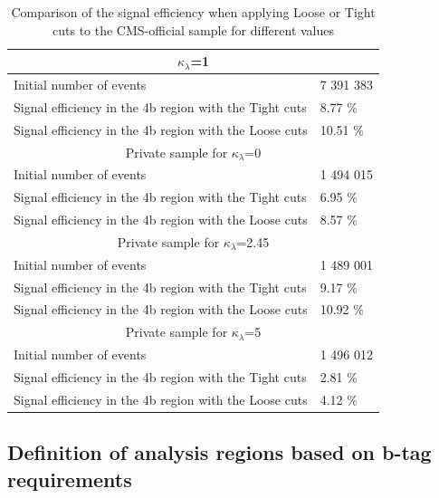 \clearpage

\begin{table}[hbt]
\centering
    \begin{tabular}{ |p{10cm}|p{3cm}| }
 \hline
 \multicolumn{2}{|c|}{$\kappa_\lambda$=1} \\
 \hline
 Initial number of events & 7 391 383 \\
 Signal efficiency in the 4b region with the {Tight cuts}  & 8.77 \%\\
 Signal efficiency in the 4b region with the {Loose cuts}  &  10.51 \% \\
 \hline
 \multicolumn{2}{|c|}{Private sample for $\kappa_\lambda$=0} \\
 \hline
 Initial number of events & 1 494 015 \\
 Signal efficiency in the 4b region with the Tight cuts  & 6.95 \% \\
 Signal efficiency in the 4b region with the Loose cuts  &  8.57 \% \\
 \hline
 \multicolumn{2}{|c|}{Private sample for $\kappa_\lambda$=2.45} \\
 \hline
 Initial number of events & 1 489 001 \\
 Signal efficiency in the 4b region with the Tight cuts  & 9.17 \% \\
 Signal efficiency in the 4b region with the Loose cuts  &  10.92 \% \\
 \hline
         \multicolumn{2}{|c|}{Private sample for $\kappa_\lambda$=5} \\
         \hline
         Initial number of events & 1 496 012 \\
         Signal efficiency in the 4b region with the Tight cuts  & 2.81 \% \\
         Signal efficiency in the 4b region with the Loose cuts  &  4.12 \% \\
         \hline
 \end{tabular}
\caption{Comparison of the signal efficiency when applying Loose or Tight cuts to the CMS-official sample for different \kl values}
\label{table: SE kl 1}
\end{table}

\clearpage

\subsection{Definition of analysis regions based on b-tag requirements} \label{subsubsecxtion: 4/2 b regions}

